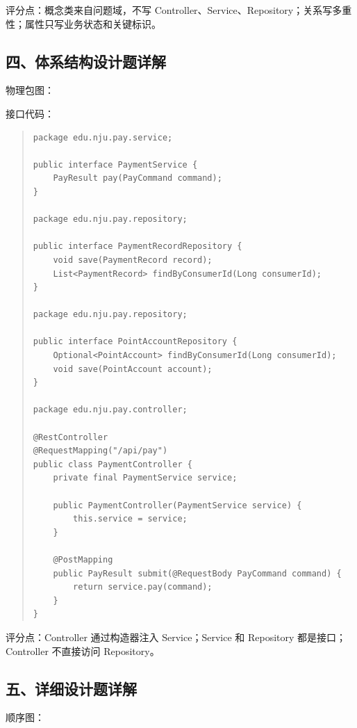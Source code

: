 \documentclass[UTF8,zihao=-4]{ctexart}
\begin{document}
评分点：概念类来自问题域，不写 Controller、Service、Repository；关系写多重性；属性只写业务状态和关键标识。


\subsection{四、体系结构设计题详解}


物理包图：





接口代码：


\begin{quote}
\footnotesize
\begin{verbatim}
package edu.nju.pay.service;

public interface PaymentService {
    PayResult pay(PayCommand command);
}

package edu.nju.pay.repository;

public interface PaymentRecordRepository {
    void save(PaymentRecord record);
    List<PaymentRecord> findByConsumerId(Long consumerId);
}

package edu.nju.pay.repository;

public interface PointAccountRepository {
    Optional<PointAccount> findByConsumerId(Long consumerId);
    void save(PointAccount account);
}

package edu.nju.pay.controller;

@RestController
@RequestMapping("/api/pay")
public class PaymentController {
    private final PaymentService service;

    public PaymentController(PaymentService service) {
        this.service = service;
    }

    @PostMapping
    public PayResult submit(@RequestBody PayCommand command) {
        return service.pay(command);
    }
}
\end{verbatim}
\end{quote}



评分点：Controller 通过构造器注入 Service；Service 和 Repository 都是接口；Controller 不直接访问 Repository。


\subsection{五、详细设计题详解}


顺序图：
\end{document}
